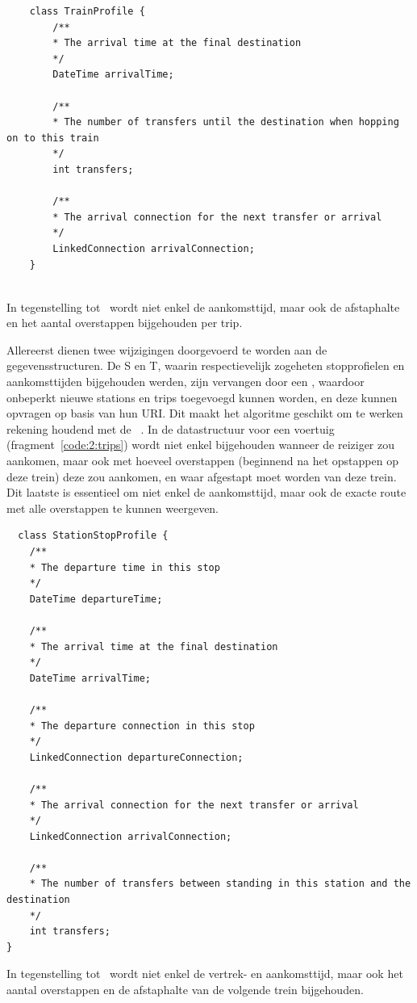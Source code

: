 \begin{listing}[!h]
	\begin{verbatim}
	class TrainProfile {
		/**
		* The arrival time at the final destination
		*/
		DateTime arrivalTime;
		
		/**
		* The number of transfers until the destination when hopping on to this train
		*/
		int transfers;
		
		/**
		* The arrival connection for the next transfer or arrival
		*/
		LinkedConnection arrivalConnection;
	}
	
	\end{verbatim}
	\caption[CSA: Gegevensstructuur voor trips]{In tegenstelling tot~\cite{strasser17} wordt niet enkel de aankomsttijd, maar ook de afstaphalte en het aantal overstappen bijgehouden per trip.}
	\label{code:2:trips}
\end{listing}

Allereerst dienen twee wijzigingen doorgevoerd te worden aan de gegevensstructuren. De  S en T, waarin respectievelijk zogeheten stopprofielen en aankomsttijden bijgehouden werden, zijn vervangen door een , waardoor onbeperkt nieuwe stations en trips toegevoegd kunnen worden, en deze kunnen opvragen op basis van hun URI. Dit maakt het algoritme geschikt om te werken rekening houdend met de ~\cite{colpaert17}.
In de datastructuur voor een voertuig (fragment~\ref{code:2:trips}) wordt niet enkel bijgehouden wanneer de reiziger zou aankomen, maar ook met hoeveel overstappen (beginnend na het opstappen op deze trein) deze zou aankomen, en waar afgestapt moet worden van deze trein. Dit laatste is essentieel om niet enkel de aankomsttijd, maar ook de exacte route met alle overstappen te kunnen weergeven. 

\begin{listing}[!h]
\begin{verbatim}
  class StationStopProfile {
	/**
	* The departure time in this stop
	*/
	DateTime departureTime;
	
	/**
	* The arrival time at the final destination
	*/
	DateTime arrivalTime;
	
	/**
	* The departure connection in this stop
	*/
	LinkedConnection departureConnection;
	
	/**
	* The arrival connection for the next transfer or arrival
	*/
	LinkedConnection arrivalConnection;
	
	/**
	* The number of transfers between standing in this station and the destination
	*/
	int transfers;
}
	\end{verbatim}
		\caption[CSA: Gegevensstructuur voor stopprofielen]{In tegenstelling tot~\cite{strasser17} wordt niet enkel de vertrek- en aankomsttijd, maar ook het aantal overstappen en de afstaphalte van de volgende trein bijgehouden.}
	\label{code:2:stations}
\end{listing}


